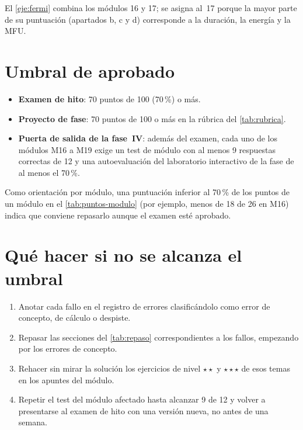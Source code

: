 El \cref{eje:fermi} combina los módulos 16 y 17; se asigna al~17 porque la mayor parte de su puntuación (apartados b, c y d) corresponde a la duración, la energía y la MFU.

\section{Umbral de aprobado}

\begin{itemize}[label=\textendash]
  \item \textbf{Examen de hito}: 70 puntos de 100 (70\,\%) o más.
  \item \textbf{Proyecto de fase}: 70 puntos de 100 o más en la rúbrica del \cref{tab:rubrica}.
  \item \textbf{Puerta de salida de la fase~IV}: además del examen, cada uno de los módulos M16 a M19 exige un test de módulo con al menos 9 respuestas correctas de 12 y una autoevaluación del laboratorio interactivo de la fase de al menos el 70\,\%.
\end{itemize}

Como orientación por módulo, una puntuación inferior al 70\,\% de los puntos de un módulo en el \cref{tab:puntos-modulo} (por ejemplo, menos de 18 de 26 en M16) indica que conviene repasarlo aunque el examen esté aprobado.

\section{Qué hacer si no se alcanza el umbral}

\begin{enumerate}[label=\arabic*.]
  \item Anotar cada fallo en el registro de errores clasificándolo como error de concepto, de cálculo o despiste.
  \item Repasar las secciones del \cref{tab:repaso} correspondientes a los fallos, empezando por los errores de concepto.
  \item Rehacer sin mirar la solución los ejercicios de nivel $\star\star$ y $\star\star\star$ de esos temas en los apuntes del módulo.
  \item Repetir el test del módulo afectado hasta alcanzar 9 de 12 y volver a presentarse al examen de hito con una versión nueva, no antes de una semana.
\end{enumerate}

